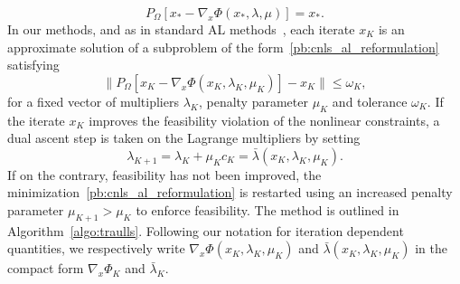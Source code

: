 \documentclass{article}
\numberwithin{equation}{section}
\newcommand{\proj}[2]{P_{#1} \left[ {#2} \right]} %
\theoremstyle{plain}
\begin{document}
	\begin{equation*}
		\proj{\Omega}{x_*-\nabla_x \Phi(x_*,\lambda,\mu)} = x_*.
	\end{equation*}
	In our methods, and as in standard AL methods~\cite{conn-etal:1991,conn-etal:2000}, each iterate $x_K$ is an approximate solution of a subproblem of the form~\eqref{pb:cnls_al_reformulation} satisfying
	\begin{equation}\label{eq:algo_traulls_criticality_test}
		\|\proj{\Omega}{x_K-\nabla_x\Phi(x_K, \lambda_K, \mu_K)}-x_K\| \le \omega_K,
	\end{equation}
	for a fixed vector of multipliers $\lambda_K$, penalty parameter $\mu_K$ and tolerance $\omega_K$.
	If the iterate $x_K$ improves the feasibility violation of the nonlinear constraints, a dual ascent step is taken on the Lagrange multipliers by setting
	\begin{equation*}
		\lambda_{K+1} = \lambda_K + \mu_K c_K = \bar{\lambda}(x_K,\lambda_K,\mu_K).
	\end{equation*}
	If on the contrary, feasibility has not been improved, the minimization~\eqref{pb:cnls_al_reformulation} is restarted using an increased penalty parameter $\mu_{K+1} > \mu_K$ to enforce feasibility. The method is outlined in Algorithm~\ref{algo:traulls}. Following our notation for iteration dependent quantities, we respectively write $\nabla_x\Phi(x_K, \lambda_K, \mu_K)$ and $\bar{\lambda}(x_K,\lambda_K,\mu_K)$ in the compact form $\nabla_x \Phi_K$ and $\bar{\lambda}_K$.
\end{document}
